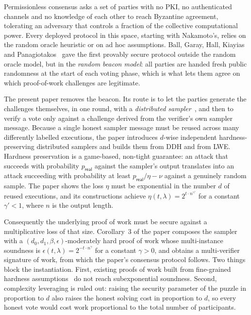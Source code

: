 \documentclass{conjura-conjecture}
\begin{document}
Permissionless consensus asks a set of parties with no PKI, no authenticated channels and no knowledge of each other to reach Byzantine agreement, tolerating an adversary that controls a fraction of the collective computational power. Every deployed protocol in this space, starting with Nakamoto's, relies on the random oracle heuristic or on ad hoc assumptions. Ball, Garay, Hall, Kiayias and Panagiotakos~\cite{BGH24a} gave the first provably secure protocol outside the random oracle model, but in the \emph{random beacon model}: all parties are handed fresh public randomness at the start of each voting phase, which is what lets them agree on which proof-of-work challenges are legitimate.

The present paper removes the beacon. Its route is to let the parties generate the challenges themselves, in one round, with a \emph{distributed sampler}~\cite{AWZ23}, and then to verify a vote only against a challenge derived from the verifier's own sampler message. Because a single honest sampler message must be reused across many differently labelled executions, the paper introduces $d$-wise independent hardness-preserving distributed samplers and builds them from DDH and from LWE. Hardness preservation is a game-based, non-tight guarantee: an attack that succeeds with probability $p_{\mathsf{real}}$ against the sampler's output translates into an attack succeeding with probability at least $p_{\mathsf{real}}/\eta - \nu$ against a genuinely random sample. The paper shows the loss $\eta$ must be exponential in the number $d$ of reused executions, and its constructions achieve $\eta(t,\lambda) = 2^{t\cdot n^{\gamma'}}$ for a constant $\gamma' < 1$, where $n$ is the output length.

Consequently the underlying proof of work must be secure against a multiplicative loss of that size. Corollary~3 of the paper composes the sampler with a $(d_0,d_1,\beta,\epsilon)$-moderately hard proof of work whose multi-instance soundness is $\epsilon(t,\lambda) = 2^{-t\cdot n^{\gamma}}$ for a constant $\gamma>0$, and obtains a multi-verifier signature of work, from which the paper's consensus protocol follows. Two things block the instantiation. First, existing proofs of work built from fine-grained hardness assumptions~\cite{BGH24a} do not reach subexponential soundness. Second, complexity leveraging is ruled out: raising the security parameter of the puzzle in proportion to $d$ also raises the honest solving cost in proportion to $d$, so every honest vote would cost work proportional to the total number of participants.
\end{document}
